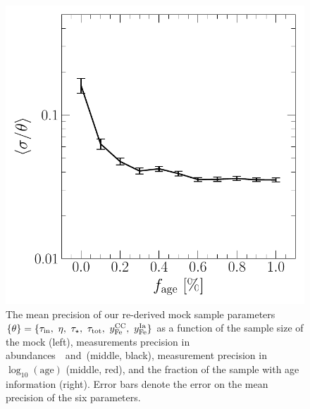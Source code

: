 \documentclass[ms.tex]{subfiles}
\begin{document}
\begin{figure}
\includegraphics[scale = 0.45]{precision_agefrac.pdf}
\caption{
The mean precision of our re-derived mock sample parameters~$\{\theta\} =
\{\tau_\text{in},~\eta,~\tau_\star,~\tau_\text{tot},~y_\text{Fe}^\text{CC},~y_\text{Fe}^\text{Ia}\}$ as a
function of the sample size of the mock (left), measurements precision in
abundances~\feh~and~\afe (middle, black), measurement precision
in~$\log_{10}(\text{age})$ (middle, red), and the fraction of the sample with
age information (right).
Error bars denote the error on the mean precision of the six parameters.
}
\label{fig:precision}
\end{figure}
\end{document}
